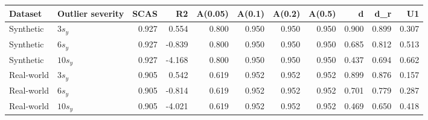 \begin{tabular}{llrrrrrrrrr}
\toprule
Dataset & Outlier severity & SCAS & R2 & A(0.05) & A(0.1) & A(0.2) & A(0.5) & d & d_r & U1 \\
\midrule
Synthetic & $3s_y$ & 0.927 & 0.554 & 0.800 & 0.950 & 0.950 & 0.950 & 0.900 & 0.899 & 0.307 \\
Synthetic & $6s_y$ & 0.927 & -0.839 & 0.800 & 0.950 & 0.950 & 0.950 & 0.685 & 0.812 & 0.513 \\
Synthetic & $10s_y$ & 0.927 & -4.168 & 0.800 & 0.950 & 0.950 & 0.950 & 0.437 & 0.694 & 0.662 \\
Real-world & $3s_y$ & 0.905 & 0.542 & 0.619 & 0.952 & 0.952 & 0.952 & 0.899 & 0.876 & 0.157 \\
Real-world & $6s_y$ & 0.905 & -0.814 & 0.619 & 0.952 & 0.952 & 0.952 & 0.701 & 0.779 & 0.287 \\
Real-world & $10s_y$ & 0.905 & -4.021 & 0.619 & 0.952 & 0.952 & 0.952 & 0.469 & 0.650 & 0.418 \\
\bottomrule
\end{tabular}
